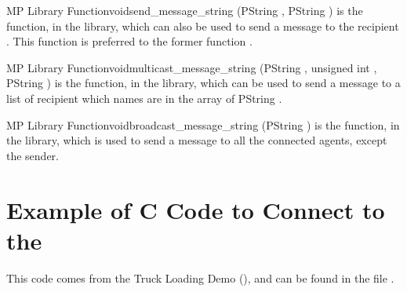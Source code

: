 \begin{typefn}{MP Library Function}{void}{send\_message\_string}
        {(PString , PString )}
is the function, in the  library, which can also be used to
send a message  to the recipient . This function
 is preferred to the former function
.
\end{typefn}

\begin{typefn}{MP Library Function}{void}{multicast\_message\_string}
        {(PString , unsigned int , PString )}
is the function, in the  library, which can be used to
send a message  to  a list of  recipient which names
are in the array of PString . 
\end{typefn}

\begin{typefn}{MP Library Function}{void}{broadcast\_message\_string}
        {(PString )}
is the function, in the  library, which is used to send a message
 to  all the connected agents, except the sender.  
\end{typefn}

\section{Example of C Code to Connect to the \MPA{}}

This code comes from the Truck Loading Demo (), and
can be found in the file .

